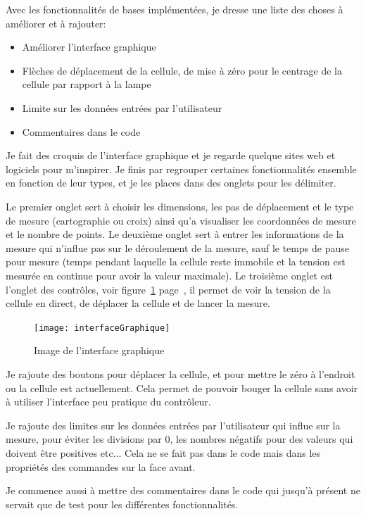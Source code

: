 \documentclass[12pt]{article}
\begin{document}
Avec les fonctionnalités de bases implémentées, je dresse une liste des choses à améliorer et à rajouter:
\begin{itemize}
	\item Améliorer l'interface graphique
	\item Flèches de déplacement de la cellule, de mise à zéro pour le centrage de la cellule par rapport à la lampe
	\item Limite sur les données entrées par l'utilisateur
	\item Commentaires dans le code
\end{itemize}
Je fait des croquis de l'interface graphique et je regarde quelque sites web et logiciels pour m'inspirer.
Je finis par regrouper certaines fonctionnalités ensemble en fonction de leur types, et je les places dans des onglets pour les délimiter.

Le premier onglet sert à choisir les dimensions, les pas de déplacement et le type de mesure (cartographie ou croix) ainsi qu'a visualiser les coordonnées de mesure et le nombre de points.
Le deuxième onglet sert à entrer les informations de la mesure qui n'influe pas sur le déroulement de la mesure, sauf le temps de pause pour mesure (temps pendant laquelle la cellule reste immobile et la tension est mesurée en continue pour avoir la valeur maximale).
Le troisième onglet est l'onglet des contrôles, voir figure~\ref{fig:interfaceGraphique} page~\pageref{fig:interfaceGraphique}, il permet de voir la tension de la cellule en direct, de déplacer la cellule et de lancer la mesure.

\begin{figure}[h]
	\centering
	\texttt{[image: interfaceGraphique]}
	\caption{Image de l'interface graphique}
	\label{fig:interfaceGraphique}
\end{figure}

Je rajoute des boutons pour déplacer la cellule, et pour mettre le zéro à l'endroit ou la cellule est actuellement.
Cela permet de pouvoir bouger la cellule sans avoir à utiliser l'interface peu pratique du contrôleur.

Je rajoute des limites sur les données entrées par l'utilisateur qui influe sur la mesure, pour éviter les divisions par 0, les nombres négatifs pour des valeurs qui doivent être positives etc... Cela ne se fait pas dans le code mais dans les propriétés des commandes sur la face avant.

Je commence aussi à mettre des commentaires dans le code qui jusqu'à présent ne servait que de test pour les différentes fonctionnalités.
\end{document}
